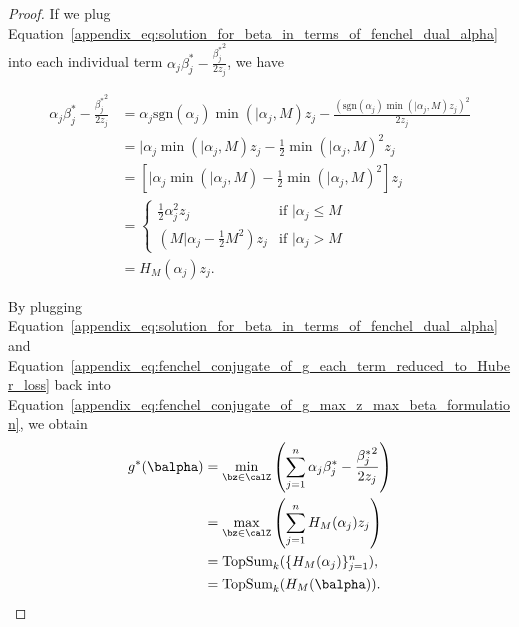 \begin{proof}
    If we plug Equation~\eqref{appendix_eq:solution_for_beta_in_terms_of_fenchel_dual_alpha} into each individual term $\alpha_j \beta_j^* - \frac{{\beta_j^*}^2}{2z_j}$, we have

    \begin{align}
        \label{appendix_eq:fenchel_conjugate_of_g_each_term_reduced_to_Huber_loss}
        \alpha_j \beta_j^* - \frac{{\beta_j^*}^2}{2z_j} &= \alpha_j \text{sgn}(\alpha_j) \min(\vert{\alpha_j}, M) z_j - \frac{\left( \text{sgn}\left( \alpha_j \right) \min\left(\vert{\alpha_j}, M \right) z_j \right)^2}{2z_j} \nonumber \\
        &= \vert{\alpha_j} \min(\vert{\alpha_j}, M) z_j - \frac{1}{2} \min(\vert{\alpha_j}, M)^2 z_j \nonumber \\
        &= \left[ \vert{\alpha_j} \min(\vert{\alpha_j}, M) - \frac{1}{2} \min(\vert{\alpha_j}, M)^2 \right] z_j \nonumber \\
        &= \begin{cases}
            \frac{1}{2} \alpha_j^2 z_j & \text{if } \vert{\alpha_j} \leq M \nonumber \\
            \left( M \vert{\alpha_j} - \frac{1}{2} M^2 \right) z_j & \text{if } \vert{\alpha_j} > M
        \end{cases} \nonumber \\
        &= H_M(\alpha_j) z_j.
    \end{align}

    By plugging Equation~\eqref{appendix_eq:solution_for_beta_in_terms_of_fenchel_dual_alpha} and Equation~\eqref{appendix_eq:fenchel_conjugate_of_g_each_term_reduced_to_Huber_loss} back into Equation~\eqref{appendix_eq:fenchel_conjugate_of_g_max_z_max_beta_formulation}, we obtain
    \begin{align*}
        g^*(\balpha) &= \min_{\bz \in \calZ} \left( \sum_{j=1}^n \alpha_j \beta_j^* - \frac{ {\beta_j^*}^2}{2z_j} \right)\\
        &= \max_{\bz \in \calZ} \left( \sum_{j=1}^n H_M(\alpha_j) z_j \right) \nonumber\\
        &= \text{TopSum}_k (\{H_M(\alpha_j)\}_{j=1}^n), \nonumber \\
        &= \text{TopSum}_k (H_M(\balpha)).
    \end{align*}

\end{proof}
